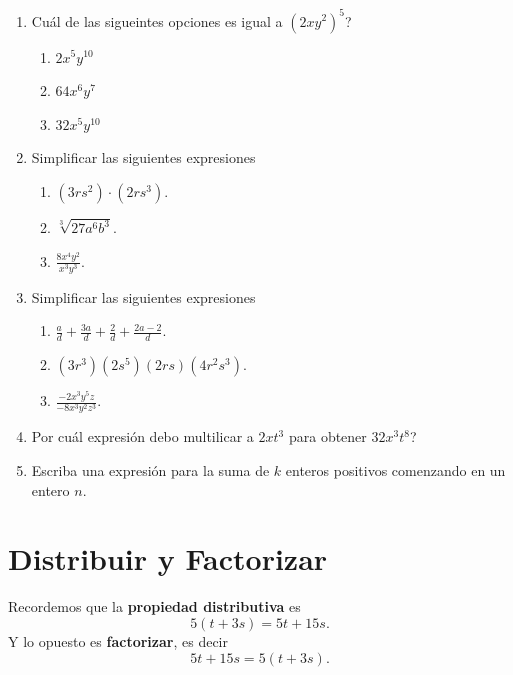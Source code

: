 \begin{enumerate}
	\item Cuál de las sigueintes opciones es igual a ${(2xy^2)}^5$?
	\begin{multicols}{3}
		\begin{enumerate}[label=\Alph*)]
			\item $2x^5y^{10}$
			\item $64x^6y^7$
			\item $32x^5y^{10}$
		\end{enumerate}
	\end{multicols}
	
	\item Simplificar las siguientes expresiones
	\begin{multicols}{3}
		\begin{enumerate}[label=\Alph*)]
			\item $(3rs^2)\cdot (2rs^3)$.
			\item $\sqrt[3]{27a^6b^3}$.
			\item $\frac{8x^4y^2}{x^3y^3}$.
		\end{enumerate}
	\end{multicols}
	
	\item Simplificar las siguientes expresiones
	\begin{multicols}{3}
		\begin{enumerate}[label=\Alph*)]
			\item $\frac{a}{d} + \frac{3a}{d} + \frac{2}{d} + \frac{2a-2}{d}$.
			\item $(3r^3)(2s^5)(2rs)(4r^2s^3)$.
			\item $\frac{-2x^3y^5z}{-8x^3y^2z^3}$.
		\end{enumerate}
	\end{multicols}
	
	\item Por cuál expresión debo multilicar a $2xt^3$ para obtener $32x^3t^8$?
	
	\item Escriba una expresión para la suma de $k$ enteros positivos comenzando en un entero $n$.
	
\end{enumerate}
\newpage


\section{Distribuir y Factorizar}\label{section_distribuir_y_factorizar}
\begin{tcolorbox}[colback=red!5!white,colframe=red!75!black]
	Recordemos que la \textbf{propiedad distributiva} es
	\[5(t+3s)=5t+15s.\]
	Y lo opuesto es \textbf{factorizar}, es decir 
	\[5t+15s=5(t+3s).\]
\end{tcolorbox}

